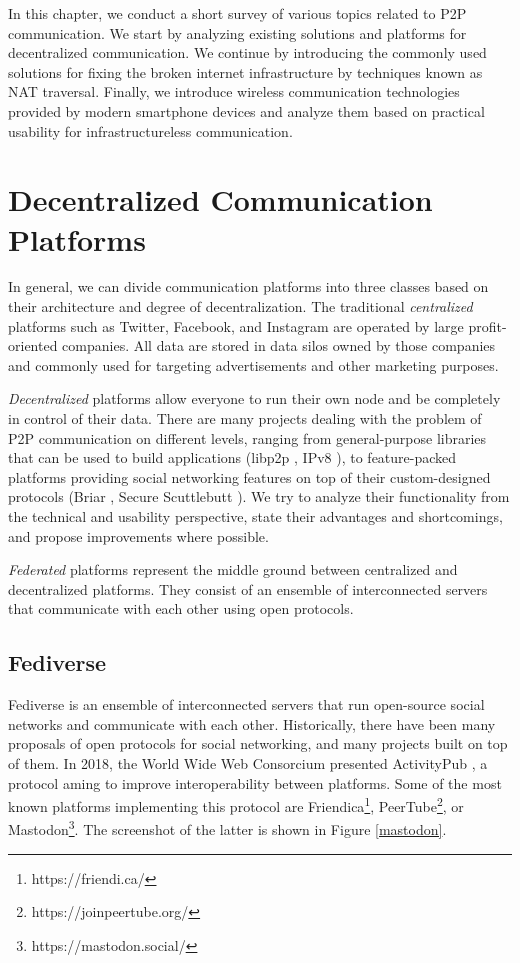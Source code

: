 
In this chapter, we conduct a short survey of various topics related to P2P communication. We start by analyzing existing solutions and platforms for decentralized communication. We continue by introducing the commonly used solutions for fixing the broken internet infrastructure by techniques known as NAT traversal. Finally, we introduce wireless communication technologies provided by modern smartphone devices and analyze them based on practical usability for infrastructureless communication.

\section{Decentralized Communication Platforms}

In general, we can divide communication platforms into three classes based on their architecture and degree of decentralization. The traditional \textit{centralized} platforms such as Twitter, Facebook, and Instagram are operated by large profit-oriented companies. All data are stored in data silos owned by those companies and commonly used for targeting advertisements and other marketing purposes.

\textit{Decentralized} platforms allow everyone to run their own node and be completely in control of their data. There are many projects dealing with the problem of P2P communication on different levels, ranging from general-purpose libraries that can be used to build applications (libp2p \cite{libp2p}, IPv8 \cite{ipv8}), to feature-packed platforms providing social networking features on top of their custom-designed protocols (Briar \cite{briar}, Secure Scuttlebutt \cite{ssb}). We try to analyze their functionality from the technical and usability perspective, state their advantages and shortcomings, and propose improvements where possible.

\textit{Federated} platforms represent the middle ground between centralized and decentralized platforms. They consist of an ensemble of interconnected servers that communicate with each other using open protocols.

\subsection{Fediverse}

Fediverse is an ensemble of interconnected servers that run open-source social networks and communicate with each other.
Historically, there have been many proposals of open protocols for social networking, and many projects built on top of them.
In 2018, the World Wide Web Consorcium presented ActivityPub \cite{activitypub}, a protocol aming to improve interoperability between platforms. Some of the most known platforms implementing this protocol are Friendica\footnote{https://friendi.ca/}, PeerTube\footnote{https://joinpeertube.org/}, or Mastodon\footnote{https://mastodon.social/}. The screenshot of the latter is shown in Figure \ref{mastodon}.

